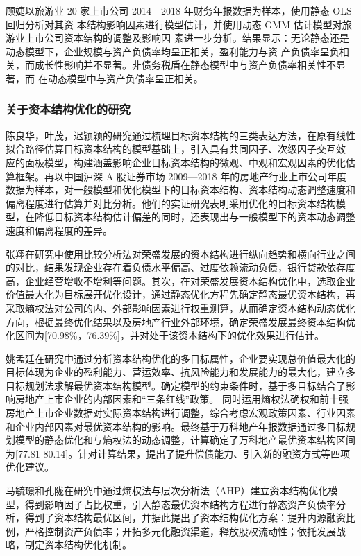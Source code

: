 顾婕以旅游业 20 家上市公司 2014—2018 年财务年报数据为样本，使用静态 OLS 回归分析对其资 本结构影响因素进行模型估计，并使用动态 GMM 估计模型对旅游业上市公司资本结构的调整及影响因 素进一步分析。结果显示：无论静态还是动态模型下，企业规模与资产负债率均呈正相关，盈利能力与资 产负债率呈负相关，而成长性影响并不显著。非债务税盾在静态模型中与资产负债率相关性不显著，而 在动态模型中与资产负债率呈正相关。\cite{Gu2022}
\subsubsection{关于资本结构优化的研究}
陈良华，叶茂，迟颖颖的研究通过梳理目标资本结构的三类表达方法，在原有线性拟合路径估算目标资本结构的模型基础上，引入具有共同因子、次级因子交互效 应的面板模型，构建涵盖影响企业目标资本结构的微观、中观和宏观因素的优化估算框架。再以中国沪深 A 股证券市场 2009—2018 年的房地产行业上市公司年度数据为样本，对一般模型和优化模型下的目标资本结构、资本结构动态调整速度和偏离程度进行估算并对比分析。他们的实证研究表明采用优化的目标资本结构模型，在降低目标资本结构估计偏差的同时，还表现出与一般模型下的资本动态调整速度和偏离程度的差异。\cite{Chen2022}

张翔在研究中使用比较分析法对荣盛发展的资本结构进行纵向趋势和横向行业之间的对比，结果发现企业存在着负债水平偏高、过度依赖流动负债，银行贷款依存度高，企业经营增收不增利等问题。其次，在对荣盛发展资本结构优化中，选取企业价值最大化为目标展开优化设计，通过静态优化方程先确定静态最优资本结构，再采取熵权法对公司的内、外部影响因素进行权重测算，从而确定资本结构动态优化方向，根据最终优化结果以及房地产行业外部环境，确定荣盛发展最终资本结构优化区间为[70.98\%，76.39\%]，并对处于该资本结构下的优化效果进行估计。\cite{Zhang2022a}

姚孟廷在研究中通过分析资本结构优化的多目标属性，企业要实现总价值最大化的目标体现为企业的盈利能力、营运效率、抗风险能力和发展能力的最大化，建立多目标规划法求解最优资本结构模型。确定模型的约束条件时，基于多目标结合了影响房地产上市企业的内部因素和“三条红线”政策。 同时运用熵权法确权和前十强房地产上市企业数据对实际资本结构进行调整，综合考虑宏观政策因素、行业因素和企业内部因素对最优资本结构的影响。最终基于万科地产年报数据通过多目标规划模型的静态优化和与熵权法的动态调整，计算确定了万科地产最优资本结构区间为[77.81-80.14]。针对计算结果，提出了提升偿债能力、引入新的融资方式等四项优化建议。\cite{Yao2022}

马毓璟和孔陇在研究中通过熵权法与层次分析法（AHP）建立资本结构优化模型，得到影响因子占比权重，引入静态最优资本结构方程进行静态资产负债率分析，得到了资本结构最优区间，并据此提出了资本结构优化方案：提升内源融资比例，严格控制资产负债率；开拓多元化融资渠道，释放股权流动性；依托发展战略，制定资本结构优化机制。\cite{Ma2022}